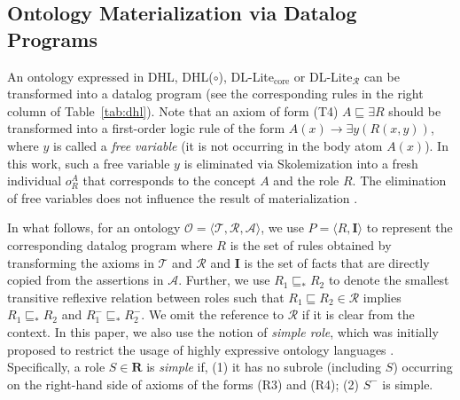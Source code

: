 \subsection{Ontology Materialization via Datalog Programs}

An ontology
expressed in DHL, DHL($\circ$), DL-Lite$_{\text{core}}$ or DL-Lite$_{\mathcal{R}}$ can be transformed into a datalog program
(see the corresponding rules in the right column of Table~\ref{tab:dhl}).
Note that an axiom of form (T4) $A\sqsubseteq\exists R$ should be
transformed into a
first-order logic rule of the form $A(x)\rightarrow \exists y(R(x,y))$, where $y$ is called a \emph{free variable} (it is
not occurring in the body atom $A(x)$).
In this work, such a free variable $y$ is eliminated via Skolemization into a fresh individual $o_{R}^A$
that corresponds to the concept $A$ and the role $R$. The elimination of free variables
does not influence the result of materialization \cite{CalvaneseGLLR07}.

In what follows, for an ontology $\mathcal{O}=\langle\mathcal{T},\mathcal{R},\mathcal{A}\rangle$,
we use $P=\langle R, \textbf{I}\rangle$ to represent the corresponding datalog program
where $R$ is the set of rules obtained by transforming the axioms in
$\mathcal{T}$ and $\mathcal{R}$ and
$\textbf{I}$ is the set of facts that are directly copied from the assertions in $\mathcal{A}$.
Further, we use $R_1\sqsubseteq_{*}R_2$ to denote the smallest transitive reflexive relation
between roles such that $R_1\sqsubseteq R_2\in\mathcal{R}$ implies $R_1\sqsubseteq_{*}R_2$
and $R_1^-\sqsubseteq_{*}R_2^-$. We omit the reference to
$\mathcal{R}$ if it is clear from the context. In this paper, we also use the
notion of \emph{simple role}, which was initially proposed to restrict the
usage of highly expressive ontology languages \cite{HorrocksS04}.
Specifically, a role $S\in\textbf{R}$ is \emph{simple} if, (1) it has no subrole (including $S$)
occurring on the right-hand side of axioms of the forms (R3) and (R4); (2) $S^-$ is simple.

